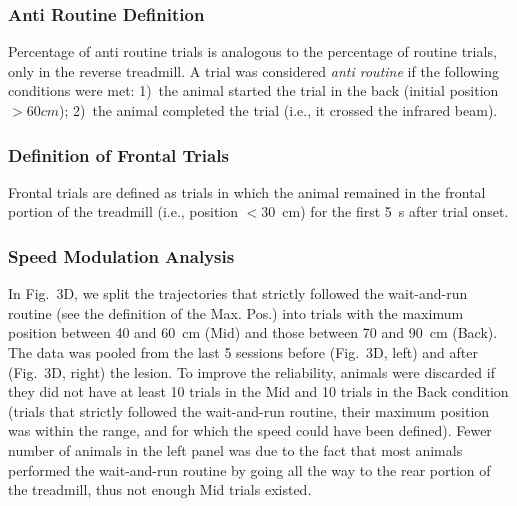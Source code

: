 \subsubsection*{Anti Routine Definition}
Percentage of anti routine trials is analogous to the percentage of routine trials, only in the reverse treadmill.
A trial was considered \textit{anti routine} if the following conditions were met:
1)~the animal started the trial in the back (initial position $> 60 cm$);
2)~the animal completed the trial (i.e., it crossed the infrared beam).


\subsubsection*{Definition of Frontal Trials}
Frontal trials are defined as trials in which the animal remained in the frontal portion of the treadmill (i.e., position $<30$~cm) for the first 5~s after trial onset.


\subsubsection*{Speed Modulation Analysis}
In Fig.~3D, we split the trajectories that strictly followed the wait-and-run routine (see the definition of the Max. Pos.) into trials with the maximum position between 40 and 60~cm (Mid) and those between 70 and 90~cm (Back).
The data was pooled from the last 5 sessions before (Fig.~3D, left) and after (Fig.~3D, right) the lesion.
To improve the reliability, animals were discarded if they did not have at least 10 trials in the Mid and 10 trials in the Back condition (trials that strictly followed the wait-and-run routine, their maximum position was within the range, and for which the speed could have been defined).
Fewer number of animals in the left panel was due to the fact that most animals performed the wait-and-run routine by going all the way to the rear portion of the treadmill, thus not enough Mid trials existed.


